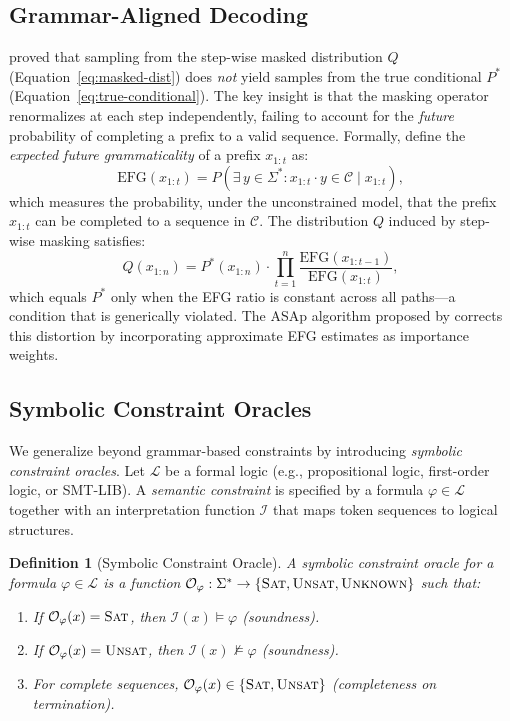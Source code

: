 \documentclass[twoside,11pt]{article}
\newtheorem{definition}[theorem]{Definition}
\newcommand{\Vocab}{\Sigma}
\newcommand{\Oracle}{\mathcal{O}}
\newcommand{\Constraint}{\mathcal{C}}
\newcommand{\Logic}{\mathcal{L}}
\newcommand{\EFG}{\mathrm{EFG}}
\begin{document}
\subsection{Grammar-Aligned Decoding}
\label{sec:prelim-gad}

\citet{ugare2024gad} proved that sampling from the step-wise masked
distribution $Q$ (Equation~\ref{eq:masked-dist}) does \emph{not} yield
samples from the true conditional $P^*$ (Equation~\ref{eq:true-conditional}).
The key insight is that the masking operator renormalizes at each step
independently, failing to account for the \emph{future} probability of
completing a prefix to a valid sequence. Formally, define the \emph{expected
future grammaticality} of a prefix $x_{1:t}$ as:
\begin{equation}
\label{eq:efg}
\EFG(x_{1:t}) = P(\exists\, y \in \Vocab^* : x_{1:t} \cdot y \in
\Constraint \mid x_{1:t}),
\end{equation}
which measures the probability, under the unconstrained model, that the
prefix $x_{1:t}$ can be completed to a sequence in $\Constraint$. The
distribution $Q$ induced by step-wise masking satisfies:
\begin{equation}
\label{eq:gcd-distortion}
Q(x_{1:n}) = P^*(x_{1:n}) \cdot \prod_{t=1}^{n}
\frac{\EFG(x_{1:t-1})}{\EFG(x_{1:t})},
\end{equation}
which equals $P^*$ only when the EFG ratio is constant across all
paths---a condition that is generically violated. The ASAp algorithm
proposed by \citet{ugare2024gad} corrects this distortion by incorporating
approximate EFG estimates as importance weights.

\subsection{Symbolic Constraint Oracles}
\label{sec:prelim-oracle}

We generalize beyond grammar-based constraints by introducing
\emph{symbolic constraint oracles}. Let $\Logic$ be a formal logic (e.g.,
propositional logic, first-order logic, or SMT-LIB). A \emph{semantic
constraint} is specified by a formula $\varphi \in \Logic$ together with
an interpretation function $\mathcal{I}$ that maps token sequences to
logical structures.

\begin{definition}[Symbolic Constraint Oracle]
\label{def:oracle}
A symbolic constraint oracle for a formula $\varphi \in \Logic$ is a
function $\Oracle_\varphi : \Vocab^* \to \{\textsc{Sat}, \textsc{Unsat},
\textsc{Unknown}\}$ such that:
\begin{enumerate}
    \item If $\Oracle_\varphi(x) = \textsc{Sat}$, then $\mathcal{I}(x)
    \models \varphi$ (soundness).
    \item If $\Oracle_\varphi(x) = \textsc{Unsat}$, then $\mathcal{I}(x)
    \not\models \varphi$ (soundness).
    \item For complete sequences, $\Oracle_\varphi(x) \in \{\textsc{Sat},
    \textsc{Unsat}\}$ (completeness on termination).
\end{enumerate}
\end{definition}
\end{document}

